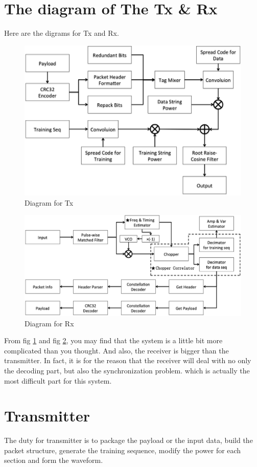 \documentclass[a4paper]{report}
\begin{document}
\section{The diagram of The Tx \& Rx}
Here are the digrams for Tx and Rx. 
\begin{figure}[!ht]
	\centering
	\includegraphics[width = 5 in]{figure/tx-diagram.png}
	\caption{Diagram for Tx}
	\label{fig:diagram for Tx}
\end{figure}
\begin{figure}[!ht]
	\centering
	\includegraphics[width = 5in]{figure/rx-diagram.png}
	\caption{Diagram for Rx}
	\label{fig:diagram for Rx}
\end{figure}

From fig \ref{fig:diagram for Tx} and fig \ref{fig:diagram for Rx}, you may find that the system is a little bit more complicated than you thought. And also, the receiver is bigger than the transmitter. In fact, it is for the reason that the receiver will deal with no only the decoding part, but also the synchronization problem. which is actually the most difficult part for this system.

\section{Transmitter} %
\label{sec:transmitter}
The duty for transmitter is to package the payload or the input data, build the packet structure, generate the training sequence, modify the power for each section and form the waveform. 
\end{document}
